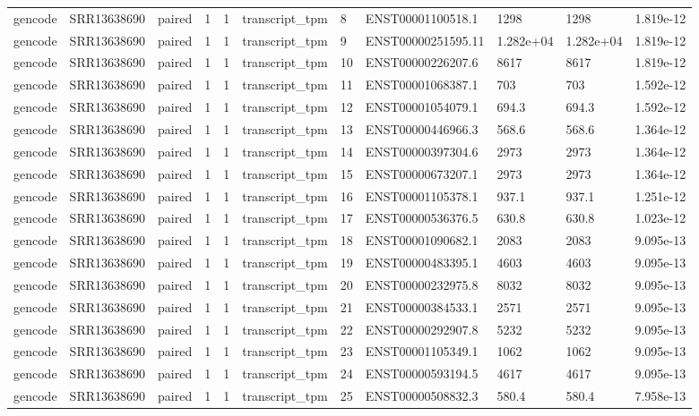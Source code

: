 \begin{tabular}{lllllllllll}
gencode & SRR13638690 & paired & 1 & 1 & transcript\_tpm & 8 & ENST00001100518.1 & 1298 & 1298 & 1.819e-12 \\
gencode & SRR13638690 & paired & 1 & 1 & transcript\_tpm & 9 & ENST00000251595.11 & 1.282e+04 & 1.282e+04 & 1.819e-12 \\
gencode & SRR13638690 & paired & 1 & 1 & transcript\_tpm & 10 & ENST00000226207.6 & 8617 & 8617 & 1.819e-12 \\
gencode & SRR13638690 & paired & 1 & 1 & transcript\_tpm & 11 & ENST00001068387.1 & 703 & 703 & 1.592e-12 \\
gencode & SRR13638690 & paired & 1 & 1 & transcript\_tpm & 12 & ENST00001054079.1 & 694.3 & 694.3 & 1.592e-12 \\
gencode & SRR13638690 & paired & 1 & 1 & transcript\_tpm & 13 & ENST00000446966.3 & 568.6 & 568.6 & 1.364e-12 \\
gencode & SRR13638690 & paired & 1 & 1 & transcript\_tpm & 14 & ENST00000397304.6 & 2973 & 2973 & 1.364e-12 \\
gencode & SRR13638690 & paired & 1 & 1 & transcript\_tpm & 15 & ENST00000673207.1 & 2973 & 2973 & 1.364e-12 \\
gencode & SRR13638690 & paired & 1 & 1 & transcript\_tpm & 16 & ENST00001105378.1 & 937.1 & 937.1 & 1.251e-12 \\
gencode & SRR13638690 & paired & 1 & 1 & transcript\_tpm & 17 & ENST00000536376.5 & 630.8 & 630.8 & 1.023e-12 \\
gencode & SRR13638690 & paired & 1 & 1 & transcript\_tpm & 18 & ENST00001090682.1 & 2083 & 2083 & 9.095e-13 \\
gencode & SRR13638690 & paired & 1 & 1 & transcript\_tpm & 19 & ENST00000483395.1 & 4603 & 4603 & 9.095e-13 \\
gencode & SRR13638690 & paired & 1 & 1 & transcript\_tpm & 20 & ENST00000232975.8 & 8032 & 8032 & 9.095e-13 \\
gencode & SRR13638690 & paired & 1 & 1 & transcript\_tpm & 21 & ENST00000384533.1 & 2571 & 2571 & 9.095e-13 \\
gencode & SRR13638690 & paired & 1 & 1 & transcript\_tpm & 22 & ENST00000292907.8 & 5232 & 5232 & 9.095e-13 \\
gencode & SRR13638690 & paired & 1 & 1 & transcript\_tpm & 23 & ENST00001105349.1 & 1062 & 1062 & 9.095e-13 \\
gencode & SRR13638690 & paired & 1 & 1 & transcript\_tpm & 24 & ENST00000593194.5 & 4617 & 4617 & 9.095e-13 \\
gencode & SRR13638690 & paired & 1 & 1 & transcript\_tpm & 25 & ENST00000508832.3 & 580.4 & 580.4 & 7.958e-13 \\

\end{tabular}
